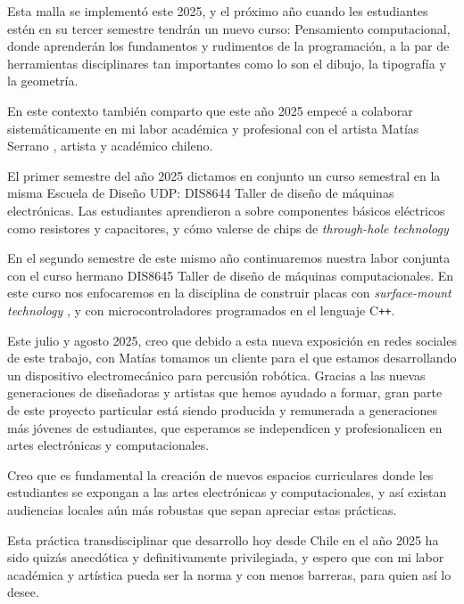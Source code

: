 \documentclass{article}
\begin{document}
Esta malla se implementó este 2025, y el próximo año cuando les estudiantes estén en su tercer semestre tendrán un nuevo curso: Pensamiento computacional, donde aprenderán los fundamentos y rudimentos de la programación, a la par de herramientas disciplinares tan importantes como lo son el dibujo, la tipografía y la geometría.

En este contexto también comparto que este año 2025 empecé a colaborar sistemáticamente en mi labor académica y profesional con el artista Matías Serrano \cite{misaa}, artista y académico chileno.

El primer semestre del año 2025 dictamos en conjunto un curso semestral en la misma Escuela de Diseño UDP: DIS8644 Taller de diseño de máquinas electrónicas. Las estudiantes aprendieron a sobre componentes básicos eléctricos como resistores y capacitores, y cómo valerse de chips de \textit{through-hole technology} \cite{tht}

En el segundo semestre de este mismo año continuaremos nuestra labor conjunta con el curso hermano DIS8645 Taller de diseño de máquinas computacionales. En este curso nos enfocaremos en la disciplina de construir placas con \textit{surface-mount technology} \cite{smt}, y con microcontroladores programados en el lenguaje C\texttt{++}.

Este julio y agosto 2025, creo que debido a esta nueva exposición en redes sociales de este trabajo, con Matías tomamos un cliente para el que estamos desarrollando un dispositivo electromecánico para percusión robótica. Gracias a las nuevas generaciones de diseñadoras y artistas que hemos ayudado a formar, gran parte de este proyecto particular está siendo producida y remunerada a generaciones más jóvenes de estudiantes, que esperamos se independicen y profesionalicen en artes electrónicas y computacionales.

Creo que es fundamental la creación de nuevos espacios curriculares donde les estudiantes se expongan a las artes electrónicas y computacionales, y así existan audiencias locales aún más robustas que sepan apreciar estas prácticas.

Esta práctica transdisciplinar que desarrollo hoy desde Chile en el año 2025 ha sido quizás anecdótica y definitivamente privilegiada, y espero que con mi labor académica y artística pueda ser la norma y con menos barreras, para quien así lo desee.

\clearpage

\printbibliography[title={Bibliografía}, heading=bibintoc]
\end{document}
